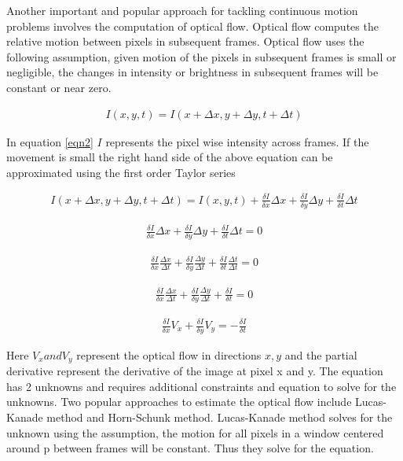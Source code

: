 \documentclass[sigconf]{acmart}
\begin{document}
Another important and popular approach for tackling continuous motion problems involves the computation of optical flow. Optical flow \cite{LK} computes the relative motion between pixels in subsequent frames. Optical flow uses the following assumption, given motion of the pixels in subsequent frames is small or negligible, the changes in intensity or brightness in subsequent frames will be constant or near zero.

\begin{align} \label{eqn2}
{I(x,y,t) = I(x+\Delta x, y+\Delta y, t+\Delta t)}
\end{align}

In equation \ref{eqn2} $I$ represents the pixel wise intensity across frames. If the movement is small the right hand side of the above equation can be approximated using the first order Taylor series 

\begin{align} \label{eqn3}
{I(x+\Delta x, y+\Delta y, t+\Delta t) = I(x,y,t) + \frac{\delta I }{\delta x} \Delta x + \frac{\delta I }{\delta y} \Delta y + \frac{\delta I }{\delta t} \Delta t}
\end{align}

\begin{align} \label{eqn4}
{\frac{\delta I }{\delta x} \Delta x + \frac{\delta I }{\delta y} \Delta y + \frac{\delta I }{\delta t} \Delta t = 0}
\end{align}

\begin{align} \label{eqn5}
{\frac{\delta I }{\delta x} \frac{\Delta x}{\Delta t} + \frac{\delta I }{\delta y} \frac{\Delta y}{\Delta t} + \frac{\delta I }{\delta t} \frac{\Delta t}{\Delta t} = 0}
\end{align}

\begin{align} \label{eqn6}
{\frac{\delta I }{\delta x} \frac{\Delta x}{\Delta t} + \frac{\delta I }{\delta y} \frac{\Delta y}{\Delta t} + \frac{\delta I }{\delta t} = 0}
\end{align}

\begin{align} \label{eqn70}
{\frac{\delta I }{\delta x} V_x+ \frac{\delta I }{\delta y} V_y = - \frac{\delta I }{\delta t}}
\end{align}

Here $V_x and V_y$ represent the optical flow in directions $x,y$ and the partial derivative represent the derivative of the image at pixel x and y. The equation has 2 unknowns and requires additional constraints and equation to solve for the unknowns. Two popular approaches to estimate the optical flow include Lucas-Kanade method and Horn-Schunk method.  Lucas-Kanade \cite{LK} method solves for the unknown using the assumption, the motion for all pixels in a window centered around p between frames will be constant. Thus they solve for the equation.
\end{document}
